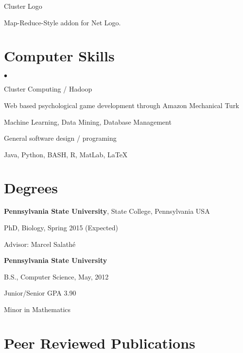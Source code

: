 \documentclass[margin,line]{res}
\newcommand{\linkToUrl}[1]{{\color{blue}\underline{\href{#1}{Link}}}}
\renewcommand{\linkToUrl}[1]{}
\newenvironment{list1}{
  \begin{list}{\ding{113}}{%
      \setlength{\itemsep}{0in}
      \setlength{\parsep}{0in} \setlength{\parskip}{0in}
      \setlength{\topsep}{0in} \setlength{\partopsep}{0in} 
      \setlength{\leftmargin}{0.17in}}}{\end{list}}
\newenvironment{list2}{
  \begin{list}{$\bullet$}{%
      \setlength{\itemsep}{0in}
      \setlength{\parsep}{0in} \setlength{\parskip}{0in}
      \setlength{\topsep}{0in} \setlength{\partopsep}{0in} 
      \setlength{\leftmargin}{10pt}}}{\end{list}}
\begin{document}
\begin{resume}
Cluster Logo \linkToUrl{http://bit.ly/12UQ4cq}
\begin{list1}
\item[] Map-Reduce-Style addon for Net Logo.
\end{list1}

\section{\sc Computer Skills} 
\begin{list2}
\item Cluster Computing / Hadoop 
\item Web based psychological game development through Amazon Mechanical Turk
\item Machine Learning, Data Mining, Database Management
\item General software design / programing
\item Java, Python, BASH, R, MatLab, \LaTeX
\end{list2}

\newpage

\section{\sc Degrees}
{\bf Pennsylvania State University}, State College, Pennsylvania USA\\
\vspace*{-.1in}
\begin{list1}
\item[] PhD, Biology, Spring 2015 (Expected)
\item[] Advisor: Marcel Salath\'e
\end{list1}



{\bf Pennsylvania State University} \\
\vspace*{-.1in}
\begin{list1}
\item[] B.S., Computer Science,  May, 2012 
\item[] Junior/Senior GPA 3.90
\item[] Minor in Mathematics
\end{list1}

\section{\sc Peer Reviewed Publications}

\begin{etaremune}[start=5,leftmargin=13pt]


\end{etaremune}
\end{resume}
\end{document}
